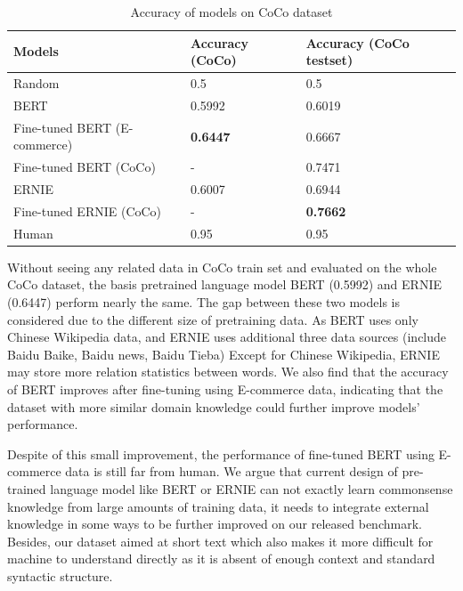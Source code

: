 \begin{table}
	\small
	\centering
	\begin{tabular}{p{2.5cm}p{2cm}p{2cm}}
		\toprule[1.1pt]
		Models & Accuracy (CoCo) & Accuracy (CoCo testset) \\
		\midrule[0.75pt]
		Random & 0.5 & 0.5\\
		BERT & 0.5992 & 0.6019\\
		Fine-tuned BERT (E-commerce)  & \textbf{0.6447} & 0.6667\\
		Fine-tuned BERT (CoCo) & - & 0.7471\\ %
		ERNIE & 0.6007 & 0.6944\\
		Fine-tuned ERNIE (CoCo) & - & \textbf{0.7662} \\ %
		\midrule[0.75pt]
		Human&0.95&0.95\\
		\bottomrule[1.1pt]
	\end{tabular}
	\caption{Accuracy of models on CoCo dataset}
	\label{tab:ExpRes}
\end{table}


Without seeing any related data in CoCo train set and evaluated on the whole CoCo dataset, the basis pretrained language model BERT (0.5992) and ERNIE (0.6447) perform nearly the same. 
The gap between these two models is considered due to the different size of pretraining data. As BERT uses only Chinese Wikipedia data, and ERNIE uses %
additional three data sources (include Baidu Baike, Baidu news, Baidu Tieba)  Except for Chinese Wikipedia, ERNIE may store more relation statistics between words. We also find that the accuracy of BERT improves after fine-tuning using E-commerce data, indicating that the dataset with more similar domain knowledge could further improve models' performance.

 Despite of this small improvement, the performance of fine-tuned BERT using E-commerce data is still far from human. We argue that current design of pre-trained language model like BERT or ERNIE can not exactly learn commonsense knowledge from large amounts of training data, it needs to integrate external knowledge in some ways to be further %
improved on our released benchmark. Besides, our dataset aimed at short text which also makes it more difficult for machine to understand directly as it is absent of enough context and standard syntactic structure.

